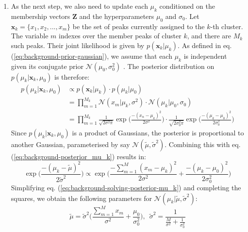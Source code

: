 \begin{enumerate}
\item As the next step, we also need to update each $\mu_k$ conditioned on the membership vectors $\boldsymbol{Z}$ and the hyperparameters $\mu_0$ and $\sigma_0$. Let $\boldsymbol{x}_k=\{x_1, x_2, ..., x_m\}$ be the set of peaks currently assigned to the $k$-th cluster. The variable $m$ indexes over the member peaks of cluster $k$, and there are $M_k$ such peaks. Their joint likelihood is given by $p(\boldsymbol{x}_k \vert \mu_k)$. As defined in eq. (\ref{eq:background-prior-gaussian}), we assume that each $\mu_k$ is independent given its conjugate prior $\mathcal{N}(\mu_0, \sigma_0^2)$ . The posterior distribution on $p(\mu_k \vert \boldsymbol{x}_k, \mu_0)$ is therefore:
\begin{equation}
\begin{aligned}
p(\mu_k \vert \boldsymbol{x}_k, \mu_0) &\propto p(\boldsymbol{x}_k \vert \mu_k) \cdot p(\mu_k \vert \mu_0) \\
                                                              &= \prod_{m=1}^{M_k} \mathcal{N}(x_m \vert \mu_k, \sigma^2) \cdot \mathcal{N}(\mu_k \vert \mu_0, \sigma_0) \\
                                                           &= \prod_{m=1}^{M_k} \frac{1}{\sqrt{2\sigma^2\pi}} \exp\bigg(\frac{-(x_n-\mu_k)^2}{2\sigma^2} \bigg) \cdot \frac{1}{\sqrt{2\sigma_0^2\pi}} \exp\bigg(\frac{-(\mu_k-\mu_0)^2}{2\sigma_0^2} \bigg)
\end{aligned}                                                           
\label{eq:background-posterior_mu_k}
\end{equation}
Since $p(\mu_k \vert \boldsymbol{x}_k, \mu_0)$ is a product of Gaussians, the posterior is proportional to another Gaussian, parameterised by say $\mathcal{N}(\tilde{\mu}, \tilde{\sigma}^2)$. Combining this with eq. (\ref{eq:background-posterior_mu_k}) results in:
\begin{equation}
\exp\bigg(\frac{-(\mu_k-\tilde{\mu})^2}{2\tilde{\sigma}^2} \bigg) \propto \exp\bigg(\frac{-\sum_{m=1}^{M} (x_m-\mu_k)^2}{2\sigma^2} + \frac{-(\mu_k-\mu_0)^2}{2\sigma_0^2}\bigg)
\label{eq:background-solving-posterior-mu_k}
\end{equation}
Simplifying eq. (\ref{eq:background-solving-posterior-mu_k}) and completing the squares, we obtain the following parameters for $\mathcal{N}(\mu_k \vert \tilde{\mu}, \tilde{\sigma}^2)$:
\begin{equation}
\tilde{\mu} = \tilde{\sigma}^2 \bigg( \frac{\sum_{m=1}^{M} x_m}{\sigma^2} + \frac{\mu_0}{\sigma_0^2} \bigg), \enspace
\tilde{\sigma}^2 = \frac{1}{\frac{M}{\sigma^2} + \frac{1}{\sigma^2_0}} 
\label{eq:background-tilde-mu-sigma}
\end{equation}


\end{enumerate}
